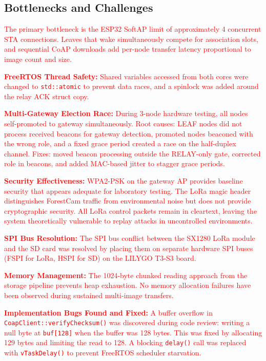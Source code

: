 \documentclass[12pt,a4paper]{article}
\DeclareRobustCommand{\changed}[1]{\textcolor{red}{#1}}
\begin{document}
\subsection{Bottlenecks and Challenges}

\changed{The primary bottleneck is the ESP32 SoftAP limit of approximately 4 concurrent STA connections. Leaves that wake simultaneously compete for association slots, and sequential CoAP downloads add per-node transfer latency proportional to image count and size.}

\changed{\textbf{FreeRTOS Thread Safety:} Shared variables accessed from both cores were changed to \texttt{std::atomic} to prevent data races, and a spinlock was added around the relay ACK struct copy.}

\changed{\textbf{Multi-Gateway Election Race:} During 3-node hardware testing, all nodes self-promoted to gateway simultaneously. Root causes: LEAF nodes did not process received beacons for gateway detection, promoted nodes beaconed with the wrong role, and a fixed grace period created a race on the half-duplex channel. Fixes: moved beacon processing outside the RELAY-only gate, corrected role in beacons, and added MAC-based jitter to stagger grace periods.}

\changed{\textbf{Security Effectiveness:} WPA2-PSK on the gateway AP provides baseline security that appears adequate for laboratory testing. The LoRa magic header distinguishes ForestCam traffic from environmental noise but does not provide cryptographic security. All LoRa control packets remain in cleartext, leaving the system theoretically vulnerable to replay attacks in uncontrolled environments.}

\changed{\textbf{SPI Bus Resolution:} The SPI bus conflict between the SX1280 LoRa module and the SD card was resolved by placing them on separate hardware SPI buses (FSPI for LoRa, HSPI for SD) on the LILYGO T3-S3 board.}

\changed{\textbf{Memory Management:} The 1024-byte chunked reading approach from the storage pipeline prevents heap exhaustion. No memory allocation failures have been observed during sustained multi-image transfers.}

\changed{\textbf{Implementation Bugs Found and Fixed:} A buffer overflow in \texttt{CoapClient::verifyChecksum()} was discovered during code review: writing a null byte at \texttt{buf[128]} when the buffer was 128 bytes. This was fixed by allocating 129 bytes and limiting the read to 128. A blocking \texttt{delay()} call was replaced with \texttt{vTaskDelay()} to prevent FreeRTOS scheduler starvation.}
\end{document}
